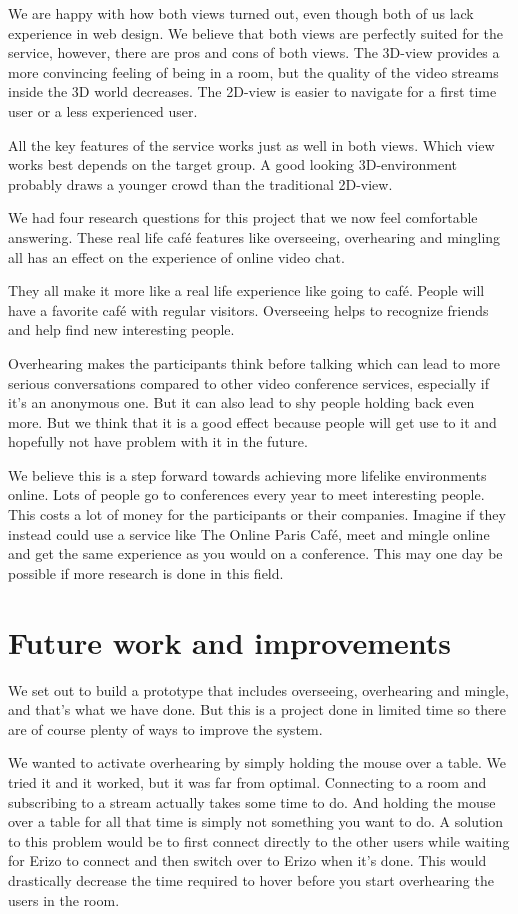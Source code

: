 \documentclass[12pt, titlepage]{article}
\begin{document}
We are happy with how both views turned out, even though both of us lack experience in web design. We believe that both views are perfectly suited for the service, however, there are pros and cons of both views. The 3D-view provides a more convincing feeling of being in a room, but the quality of the video streams inside the 3D world decreases. The 2D-view is easier to navigate for a first time user or a less experienced user. 

All the key features of the service works just as well in both views. Which view works best depends on the target group. A good looking 3D-environment probably draws a younger crowd than the traditional 2D-view.

We had four research questions for this project that we now feel comfortable answering. These real life café features like overseeing, overhearing and mingling all has an effect on the experience of online video chat.

They all make it more like a real life experience like going to café. People will have a favorite café with regular visitors. Overseeing helps to recognize friends and help find new interesting people. 

Overhearing makes the participants think before talking which can lead to more serious conversations compared to other video conference services, especially if it's an anonymous one. But it can also lead to shy people holding back even more. But we think that it is a good effect because people will get use to it and hopefully not have problem with it in the future.

We believe this is a step forward towards achieving more lifelike environments online. Lots of people go to conferences every year to meet interesting people. This costs a lot of money for the participants or their companies. Imagine if they instead could use a service like The Online Paris Café, meet and mingle online and get the same experience as you would on a conference. This may one day be possible if more research is done in this field.
\section{Future work and improvements}
We set out to build a prototype that includes overseeing, overhearing and mingle, and that's what we have done. But this is a project done in limited time so there are of course plenty of ways to improve the system.

We wanted to activate overhearing by simply holding the mouse over a table. We tried it and it worked, but it was far from optimal. Connecting to a room and subscribing to a stream actually takes some time to do. And holding the mouse over a table for all that time is simply not something you want to do. A solution to this problem would be to first connect directly to the other users while waiting for Erizo to connect and then switch over to Erizo when it's done. This would drastically decrease the time required to hover before you start overhearing the users in the room.
\end{document}
